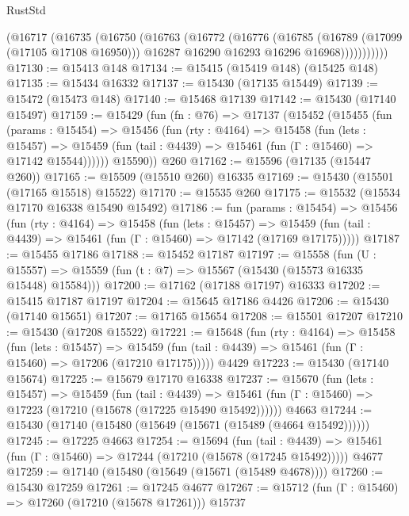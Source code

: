 \begin{lexlean}{RustStd}
\begin{coremodule}
{\begin{coremodule}
{{{{{{{{{{{{{{{{{{{{{{{{{{{{{{{{{{{{{{{{{{{{{{{{{{{{{{{{{{{{            (@16717
              (@16735
                (@16750
                  (@16763
                    (@16772
                      (@16776
                        (@16785
                          (@16789 (@17099 (@17105 @17108 @16950)))
                          @16287
                          @16290
                          @16293
                          @16296
                          @16968)))))))))))
@17130 := @15413 @148
@17134 := @15415 (@15419 @148) (@15425 @148)
@17135 := @15434 @16332
@17137 := @15430 (@17135 @15449)
@17139 := @15472 (@15473 @148)
@17140 := @15468 @17139
@17142 := @15430 (@17140 @15497)
@17159 := @15429
    (fun (fn : @76) =>
    @17137
      (@15452
        (@15455
          (fun (params : @15454) =>
          @15456
            (fun (rty : @4164) =>
            @15458
              (fun (lets : @15457) =>
              @15459 (fun (tail : @4439) => @15461 (fun (Γ : @15460) => @17142 @15544))))))
        @15590))
    @260
@17162 := @15596 (@17135 (@15447 @260))
@17165 := @15509 (@15510 @260) @16335
@17169 := @15430 (@15501 (@17165 @15518) @15522)
@17170 := @15535 @260
@17175 := @15532 (@15534 @17170 @16338 @15490 @15492)
@17186 := fun (params : @15454) =>
  @15456
    (fun (rty : @4164) =>
    @15458
      (fun (lets : @15457) =>
      @15459 (fun (tail : @4439) => @15461 (fun (Γ : @15460) => @17142 (@17169 @17175)))))
@17187 := @15455 @17186
@17188 := @15452 @17187
@17197 := @15558
    (fun (U : @15557) => @15559 (fun (t : @7) => @15567 (@15430 (@15573 @16335 @15448) @15584)))
@17200 := @17162 (@17188 @17197) @16333
@17202 := @15415 @17187 @17197
@17204 := @15645 @17186 @4426
@17206 := @15430 (@17140 @15651)
@17207 := @17165 @15654
@17208 := @15501 @17207
@17210 := @15430 (@17208 @15522)
@17221 := @15648
    (fun (rty : @4164) =>
    @15458
      (fun (lets : @15457) =>
      @15459 (fun (tail : @4439) => @15461 (fun (Γ : @15460) => @17206 (@17210 @17175)))))
    @4429
@17223 := @15430 (@17140 @15674)
@17225 := @15679 @17170 @16338
@17237 := @15670
    (fun (lets : @15457) =>
    @15459
      (fun (tail : @4439) =>
      @15461 (fun (Γ : @15460) => @17223 (@17210 (@15678 (@17225 @15490 @15492))))))
    @4663
@17244 := @15430 (@17140 (@15480 (@15649 (@15671 (@15489 (@4664 @15492))))))
@17245 := @17225 @4663
@17254 := @15694
    (fun (tail : @4439) => @15461 (fun (Γ : @15460) => @17244 (@17210 (@15678 (@17245 @15492)))))
    @4677
@17259 := @17140 (@15480 (@15649 (@15671 (@15489 @4678))))
@17260 := @15430 @17259
@17261 := @17245 @4677
@17267 := @15712 (fun (Γ : @15460) => @17260 (@17210 (@15678 @17261))) @15737
}}}}}}}}}}}}}}}}}}}}}}}}}}}}}}}}}}}}}}}}}}}}}}}}}}}}}}}}}}}}
\end{coremodule}}
\end{coremodule}
\end{lexlean}
